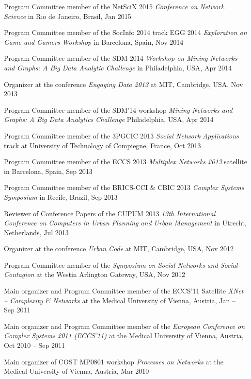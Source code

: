 \documentclass[10pt,a4paper]{article}
\renewenvironment{itemize}{
  \begin{list}{}{
    \setlength{\leftmargin}{1.5em}
    \setlength{\itemsep}{0.25em}
    \setlength{\parskip}{0pt}
    \setlength{\parsep}{0.25em}
  }
}{
  \end{list}
}
\begin{document}
\begin{itemize}
\item{Program Committee member of the NetSciX 2015 \emph{Conference on Network Science} in Rio de Janeiro, Brasil, Jan 2015}
\item{Program Committee member of the SocInfo 2014 track EGG 2014 \emph{Exploration on Game and Gamers Workshop} in Barcelona, Spain, Nov 2014}
\item{Program Committee member of the SDM 2014 \emph{Workshop on Mining Networks and Graphs: A Big Data Analytic Challenge} in Philadelphia, USA, Apr 2014}
\item{Organizer at the conference \emph{Engaging Data 2013} at MIT, Cambridge, USA, Nov 2013}
\item{Program Committee member of the SDM'14 workshop \emph{Mining Networks and Graphs: A Big Data Analytics Challenge} Philadelphia, USA, Apr 2014}
\item{Program Committee member of the 3PGCIC 2013 \emph{Social Network Applications} track at University of Technology of Compiegne, France, Oct 2013}
\item{Program Committee member of the ECCS 2013 \emph{Multiplex Networks 2013} satellite in Barcelona, Spain, Sep 2013}
\item{Program Committee member of the BRICS-CCI \& CBIC 2013 \emph{Complex Systems Symposium} in Recife, Brazil, Sep 2013}
\item{Reviewer of Conference Papers of the CUPUM 2013 \emph{13th International Conference on Computers in Urban Planning and Urban Management} in Utrecht, Netherlands, Jul 2013}
\item{Organizer at the conference \emph{Urban Code} at MIT, Cambridge, USA, Nov 2012}
\item{Program Committee member of the \emph{Symposium on Social Networks and Social Contagion} at the Westin Arlington Gateway, USA, Nov 2012}
\item{Main organizer and Program Committee member of the ECCS'11 Satellite \emph{XNet -- Complexity \& Networks} at the Medical University of Vienna, Austria, Jan -- Sep 2011}
\item{Main organizer and Program Committee member of the \emph{European Conference on Complex Systems 2011 (ECCS'11)} at the Medical University of Vienna, Austria, Oct 2010 -- Sep 2011}
\item{Main organizer of COST MP0801 workshop \emph{Processes on Networks} at the Medical University of Vienna, Austria, Mar 2010}
\end{itemize}
\end{document}
